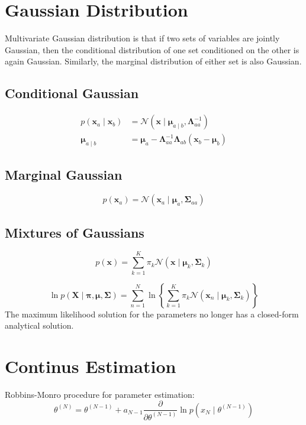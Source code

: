 \documentclass{article}
\begin{document}
\section{Gaussian Distribution}
Multivariate Gaussian distribution is that if two sets of variables are jointly Gaussian, then the conditional distribution of one set conditioned on the other is again Gaussian. Similarly, the marginal distribution of either set is also Gaussian.
\subsection{Conditional Gaussian}
$$
\begin{aligned}
p\left(\mathbf{x}_{a} \mid \mathbf{x}_{b}\right) &=\mathcal{N}\left(\mathbf{x} \mid \boldsymbol{\mu}_{a \mid b}, \mathbf{\Lambda}_{a a}^{-1}\right) \\
\boldsymbol{\mu}_{a \mid b} &=\boldsymbol{\mu}_{a}-\mathbf{\Lambda}_{a a}^{-1} \boldsymbol{\Lambda}_{a b}\left(\mathbf{x}_{b}-\boldsymbol{\mu}_{b}\right)
\end{aligned}
$$
\subsection{Marginal Gaussian}
$$
p\left(\mathbf{x}_{a}\right)=\mathcal{N}\left(\mathbf{x}_{a} \mid \boldsymbol{\mu}_{a}, \mathbf{\Sigma}_{a a}\right)
$$
\subsection{Mixtures of Gaussians}
$$
p(\mathbf{x})=\sum_{k=1}^{K} \pi_{k} \mathcal{N}\left(\mathbf{x} \mid \boldsymbol{\mu}_{k}, \boldsymbol{\Sigma}_{k}\right)
$$


$$
\ln p(\mathbf{X} \mid \boldsymbol{\pi}, \boldsymbol{\mu}, \boldsymbol{\Sigma})=\sum_{n=1}^{N} \ln \left\{\sum_{k=1}^{K} \pi_{k} \mathcal{N}\left(\mathbf{x}_{n} \mid \boldsymbol{\mu}_{k}, \boldsymbol{\Sigma}_{k}\right)\right\}
$$
The maximum likelihood solution for the parameters no longer has a closed-form analytical solution.

\section{Continus Estimation}
Robbins-Monro procedure for parameter estimation:
$$
\theta^{(N)}=\theta^{(N-1)}+a_{N-1} \frac{\partial}{\partial \theta^{(N-1)}} \ln p\left(x_{N} \mid \theta^{(N-1)}\right)
$$



\appendix
\end{document}
